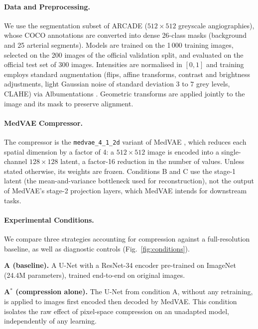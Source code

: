 \documentclass[conference]{IEEEtran}
\begin{document}
\paragraph{Data and Preprocessing.}
We use the segmentation subset of ARCADE \cite{popov2024arcade} ($512 \times 512$ greyscale angiographies), whose COCO annotations are converted into dense 26-class masks (background and 25 arterial segments). Models are trained on the 1\,000 training images, selected on the 200 images of the official validation split, and evaluated on the official test set of 300 images. Intensities are normalised in $[0,1]$ and training employs standard augmentation (flips, affine transforms, contrast and brightness adjustments, light Gaussian noise of standard deviation $3$ to $7$ grey levels, CLAHE) via Albumentations \cite{buslaev2020albumentations}. Geometric transforms are applied jointly to the image and its mask to preserve alignment.

\paragraph{MedVAE Compressor.}
The compressor is the \texttt{medvae\_4\_1\_2d} variant of MedVAE \cite{varma2025medvaeefficientautomatedinterpretation}, which reduces each spatial dimension by a factor of 4: a $512 \times 512$ image is encoded into a single-channel $128 \times 128$ latent, a factor-16 reduction in the number of values. Unless stated otherwise, its weights are frozen. Conditions B and C use the stage-1 latent (the mean-and-variance bottleneck used for reconstruction), not the output of MedVAE's stage-2 projection layers, which MedVAE intends for downstream tasks.

\paragraph{Experimental Conditions.}
We compare three strategies accounting for compression against a full-resolution baseline, as well as diagnostic controls (Fig.~\ref{fig:conditions}).

\textbf{A (baseline).} A U-Net \cite{ronneberger2015unet} with a ResNet-34 \cite{he2016resnet} encoder pre-trained on ImageNet (24.4M parameters), trained end-to-end on original images.

\textbf{A$^{*}$ (compression alone).} The U-Net from condition A, without any retraining, is applied to images first encoded then decoded by MedVAE. This condition isolates the raw effect of pixel-space compression on an unadapted model, independently of any learning.
\end{document}
